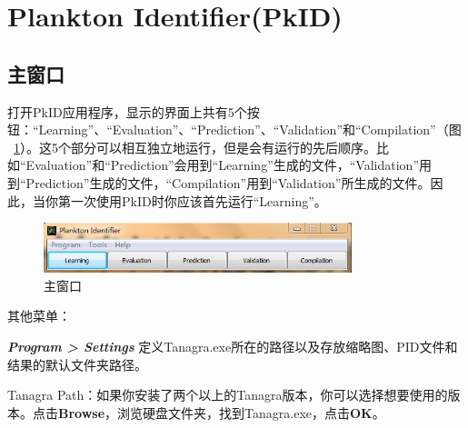 \documentclass[12pt]{article}
\begin{document}


%
%
%
%

\section{Plankton Identifier(PkID)}

\subsection{主窗口}

打开PkID应用程序，显示的界面上共有5个按钮：“Learning”、“Evaluation”、“Prediction”、“Validation”和“Compilation”（图~\ref{fig: Main window}）。这5个部分可以相互独立地运行，但是会有运行的先后顺序。比如“Evaluation”和“Prediction”会用到“Learning”生成的文件，“Validation”用到“Prediction”生成的文件，“Compilation”用到“Validation”所生成的文件。因此，当你第一次使用PkID时你应该首先运行“Learning”。

\begin{figure}[!ht]
\centering
\includegraphics[width=0.8\textwidth]{mainWindow.png}
\caption{主窗口}
\label{fig: Main window}
\end{figure} 

其他菜单：

\textit{\textbf{Program > Settings}} 定义Tanagra.exe所在的路径以及存放缩略图、PID文件和结果的默认文件夹路径。

Tanagra Path：如果你安装了两个以上的Tanagra版本，你可以选择想要使用的版本。点击\textbf{Browse}，浏览硬盘文件夹，找到Tanagra.exe，点击\textbf{OK}。
\end{document}
